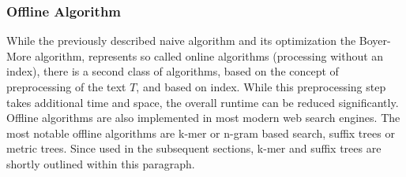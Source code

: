 \subsubsection{Offline Algorithm}
While the previously described naive algorithm and its optimization the Boyer-More algorithm, represents so called online algorithms (processing without an index), there is a second class of algorithms, based on the concept of preprocessing of the text $T$, and based on index. While this preprocessing step takes additional time and space, the overall runtime can be reduced significantly. Offline algorithms are also implemented in most modern web search engines.  The most notable offline algorithms are  k-mer or n-gram based search, suffix trees or metric trees. Since used in the subsequent sections, k-mer and suffix trees are shortly outlined within this paragraph.
